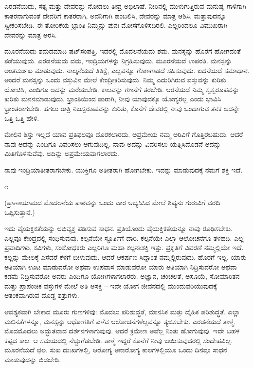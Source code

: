 ಎರಡನೆಯದು, ಸತ್ಯ ಮತ್ತು ದೇವರನ್ನು ನೋಡಲು ತೀವ್ರ ಅಭಿಲಾಷೆ. ನೀರಿನಲ್ಲಿ ಮುಳುಗುತ್ತಿರುವ ಮನುಷ್ಯ ಗಾಳಿಗಾಗಿ ಕಾತರನಾಗುವಂತೆ ದೇವರಿಗೆ ಕಾತರರಾಗಿ, ಅವನಿಗಾಗಿ ಹಂಬಲಿಸಿ, ದೇವರನ್ನು ಮಾತ್ರ ಆಶಿಸಿ, ಮತ್ತಾವುದನ್ನೂ ಸ್ವೀಕರಿಸಬೇಡಿ. ಈ ತೋರಿಕೆಯ ಭ್ರಾಂತಿ ನಿಮ್ಮನ್ನು ಪುನಃ ಮೋಸಗೊಳಿಸದಿರಲಿ. ಎಲ್ಲರಿಂದಲೂ ವಿಮುಖರಾಗಿ ದೇವರನ್ನು ಮಾತ್ರ ಅರಸಿ.

ಮೂರನೆಯದು ಶಮದಮಾದಿ ಷಟ್‌ಸಂಪತ್ತಿ. ಇದರಲ್ಲಿ ಮೊದಲನೆಯದು ಶಮ. ಮನಸ್ಸನ್ನು ಹೊರಗೆ ಹೋಗದಂತೆ ತಡೆಯುವುದು. ಎರಡನೆಯದು ದಮ, ಇಂದ್ರಿಯಗಳನ್ನು ನಿಗ್ರಹಿಸುವುದು. ಮೂರನೆಯದೆ ಉಪರತಿ. ಮನಸ್ಸನ್ನು ಅಂತರ್ಮುಖ ಮಾಡುವುದು. ನಾಲ್ಕನೆಯದೆ ತಿತಿಕ್ಷೆ, ಎಲ್ಲವನ್ನೂ ಗೊಣಗಾಡದೆ ಸಹಿಸುವುದು. ಐದನೆಯದೆ ಸಮಾಧಾನ. ಅಂದರೆ ಮನಸ್ಸನ್ನು ಒಂದು ವಸ್ತುವಿನ ಮೇಲೆ ಕೇಂದ್ರೀಕರಿಸುವುದು. ನಿಮ್ಮ ಎದುರಿಗಿರುವ ವಸ್ತುವನ್ನು ಕುರಿತು ಯೋಚಿಸಿ, ಎಂದಿಗೂ ಅದನ್ನು ಮರೆಯಬೇಡಿ. ಕಾಲವನ್ನು ಗಣನೆಗೆ ತರಬೇಡಿ. ಆರನೆಯದೆ ನಿಮ್ಮ ಸ್ವಸ್ವರೂಪವನ್ನು ಕುರಿತು ಮನನಮಾಡುವುದು. ಭ್ರಾಂತಿಯಿಂದ ಪಾರಾಗಿ, ನೀವು ಯಾವುದಕ್ಕೂ ಯೋಗ್ಯರಲ್ಲ ಎಂದು ಭಾವಿಸಿ ಭ್ರಾಂತರಾಗಬೇಡಿ. ಹಗಲು ರಾತ್ರಿ ನಿಜಸ್ವರೂಪವನ್ನು ಕುರಿತು, ಕೊನೆಗೆ ದೇವರಲ್ಲಿ ನೀವು ಒಂದಾಗುವ ತನಕ ಅದನ್ನೇ ಒತ್ತಿ ಒತ್ತಿ ಹೇಳಿ.

ಮೇಲಿನ ಶಿಸ್ತು ಇಲ್ಲದೆ ಯಾವ ಪ್ರತಿಫಲವೂ ದೊರಕಲಾರದು. ಅಪ್ರಮೇಯ ನಮ್ಮ ಅರಿವಿಗೆ ಗೊತ್ತಿರಬಹುದು. ಆದರೆ ನಾವು ಅದನ್ನು ಎಂದಿಗೂ ವಿವರಿಸಲು ಆಗುವುದಿಲ್ಲ. ನಾವು ಅದನ್ನು ವಿವರಿಸಲು ಯತ್ನಿಸಿದೊಡನೆ ಅದನ್ನು ಮಿತಿಗೊಳಿಸುವೆವು. ಅದಿನ್ನು ಅಪ್ರಮೇಯವಾಗಲಾರದು.

ನಾವು ಇಂದ್ರಿಯಾತೀತರಾಗಬೇಕು. ಯುಕ್ತಿಗೂ ಅತೀತರಾಗಿ ಹೋಗಬೇಕು. ಇದನ್ನು ಮಾಡುವುದಕ್ಕೆ ನಮಗೆ ಶಕ್ತಿ ಇದೆ.

\begin{center}
೧
\end{center}

(ಪ್ರಾಣಾಯಾಮದ ಮೊದಲನೆಯ ಪಾಠವನ್ನು ಒಂದು ವಾರ ಅಭ್ಯಸಿಸಿದ ಮೇಲೆ ಶಿಷ್ಯನು ಗುರುವಿಗೆ ವರದಿ ಒಪ್ಪಿಸುತ್ತಾನೆ.)

ಇದು ವೈಯಕ್ತಿಕತೆಯನ್ನು ಅಭಿವ್ಯಕ್ತ ಪಡಿಸುವ ಸಾಧನ. ಪ್ರತಿಯೊಂದು ವೈಯಕ್ತಿಕತೆಯನ್ನೂ ನಾವು ರೂಢಿಸಬೇಕು. ಎಲ್ಲವೂ ಕೇಂದ್ರದಲ್ಲಿ ಸಂಧಿಸುವುವು. ಕಲ್ಪನೆಯೇ ಸ್ಫೂರ್ತಿಗೆ ದಾರಿ. ಕಲ್ಪನೆಯೇ ಎಲ್ಲಾ ಆಲೋಚನೆಗೂ ತಳಹದಿ. ಎಲ್ಲ ಪ್ರವಾದಿಗಳು, ಕವಿಗಳು, ಸಂಶೋಧಕರು ಎಲ್ಲರಿಗೂ ಮಹಾ ಕಲ್ಪನಾಶಕ್ತಿ ಇತ್ತು. ಪ್ರಕೃತಿಗೆ ವಿವರಣೆ ನಮ್ಮಲ್ಲಿಯೇ ಇದೆ. ಕಲ್ಲನ್ನು ಮೇಲಕ್ಕೆ ಎಸೆದರೆ ಕೆಳಗೆ ಬೀಳುವುದು. ಆದರೆ ಆಕರ್ಷಣ ಸಿದ್ದಾಂತ ನಮ್ಮಲ್ಲಿರುವುದು. ಹೊರಗೆ ಇಲ್ಲ. ಯಾರು ಅತಿಯಾಗಿ ಊಟ ಮಾಡುವರೋ ಅಥವಾ ಉಪವಾಸ ಮಾಡುವರೋ ಯಾರು ಅತಿಯಾಗಿ ನಿದ್ರಿಸುವರೋ ಅಥವಾ ಕಡಮೆ ನಿದ್ರಿಸುವರೋ ಅವರು ಎಂದಿಗೂ ಯೋಗಿಗಳಾಗಲಾರರು. ಅಜ್ಞಾನ, ಚಂಚಲತೆ, ಅಸೂಯೆ, ಸೋಮಾರಿತನ ಮತ್ತು ಪ್ರಾಪಂಚಿಕ ವಸ್ತುಗಳ ಮೇಲೆ ಅತಿ ಆಸಕ್ತಿ – ಇವೇ ಯೋಗ ಜೀವನದಲ್ಲಿ ಮುಂದುವರಿಯುವುದಕ್ಕೆ ಆತಂಕವಾಗಿರುವ ದೊಡ್ಡ ಶತ್ರುಗಳು.

ಆವಶ್ಯಕವಾಗಿ ಬೇಕಾದ ಮೂರು ಗುಣಗಳಿವು: ಮೊದಲು ಪರಿಶುದ್ಧತೆ, ಮಾನಸಿಕ ಮತ್ತು ದೈಹಿಕ ಪರಿಶುದ್ಧತೆ. ಎಲ್ಲಾ ಮಲಿನತೆಗಳನ್ನೂ, ಮನಸ್ಸನ್ನು ಅಧೋಗತಿಗೆ ಎಳೆವ ಆಲೋಚನೆಗಳೆಲ್ಲವನ್ನೂ ತ್ಯಜಿಸಬೇಕು. ಎರಡನೆಯದೆ ತಾಳ್ಮೆ. ಮೊದಮೊದಲು ಅದ್ಭುತವಾದ ದರ್ಶನಗಳಾಗುವುವು. ಆದರೆ ಕ್ರಮೇಣ ಅವೆಲ್ಲ ನಿಂತು ಹೋಗುವುವು. ಇದೇ ಬಹಳ ಕಷ್ಟದ ಕಾಲ. ಆ ಸಮಯದಲ್ಲಿ ನೆಚ್ಚುಗೆಡಬೇಡಿ. ತಾಳ್ಮೆ ಇದ್ದರೆ ಕೊನೆಗೆ ನೀವು ಜಯಿಸುವುದರಲ್ಲಿ ಸಂದೇಹವಿಲ್ಲ. ಮೂರನೆಯದೆ ಛಲ. ಸುಖ ದುಃಖಗಳಲ್ಲಿ, ಆರೋಗ್ಯ ಅನಾರೋಗ್ಯ ಕಾಲಗಳಲ್ಲಿಯೂ ಒಂದು ದಿನವೂ ಸಾಧನೆ ಮಾಡುವುದನ್ನು ಬಿಡಬೇಡಿ.

